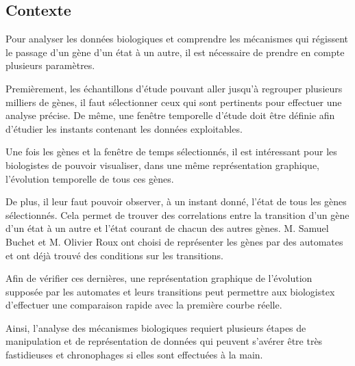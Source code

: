 \subsection{Contexte}
Pour analyser les données biologiques et comprendre les mécanismes qui régissent le passage d'un gène d'un état à un autre, il est nécessaire de prendre en compte plusieurs paramètres. 
\newline 

Premièrement, les échantillons d'étude pouvant aller jusqu'à regrouper plusieurs milliers de gènes, il faut sélectionner ceux qui sont pertinents pour effectuer une analyse précise. De même, une fenêtre temporelle d'étude doit être définie afin d'étudier les instants contenant les données exploitables.
\newline 

Une fois les gènes et la fenêtre de temps sélectionnés, il est intéressant pour les biologistes de pouvoir visualiser, dans une même représentation graphique, l'évolution temporelle de tous ces gènes.
\newline 

De plus, il leur faut pouvoir observer, à un instant donné, l'état de tous les gènes sélectionnés. Cela permet de trouver des correlations entre la transition d'un gène d'un état à un autre et l'état courant de chacun des autres gènes. M. Samuel Buchet et M. Olivier Roux ont choisi de représenter les gènes par des automates et ont déjà trouvé des conditions sur les transitions.
\newline 

Afin de vérifier ces dernières, une représentation graphique de l'évolution supposée par les automates et leurs transitions peut permettre aux biologistex d'effectuer une comparaison rapide avec la première courbe réelle.
\newline 

Ainsi, l'analyse des mécanismes biologiques requiert plusieurs étapes de manipulation et de représentation de données qui peuvent s'avérer être très fastidieuses et chronophages si elles sont effectuées à la main. 
\bigbreak
\bigbreak

